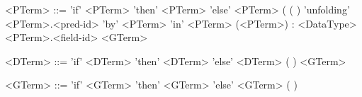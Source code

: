 \begin{grammar}
<PTerm> ::= 'if' <PTerm> 'then' <PTerm> 'else' <PTerm>
	\alt <var-id>
	\alt <func-id>(  
	\alt <dom-func-id>(  )
	\alt 'unfolding' <PTerm>.<pred-id> 'by' <PTerm> 'in' <PTerm>
	\alt (<PTerm>) : <DataType>
	\alt <PTerm>.<field-id>
	\alt <GTerm>
\end{grammar}

\begin{grammar}
<DTerm> ::= 'if' <DTerm> 'then' <DTerm> 'else' <DTerm>
	\alt <logical-var-id>
	\alt <dom-func-id>(  )
	\alt <GTerm>
\end{grammar}

\begin{grammar}
<GTerm> ::= 'if' <GTerm> 'then' <GTerm> 'else' <GTerm>
	\alt <integer-literal>
	\alt 	\alt <dom-func-id>(  )
\end{grammar}